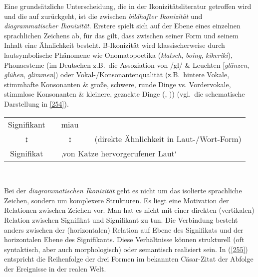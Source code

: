 Eine grundsätzliche Unterscheidung, die in der Ikonizitätsliteratur getroffen wird und die auf \citet[2.277]{Peirce1960} zurückgeht, ist die zwischen \textit{bildhafter Ikonizität} und  \textit{diagrammatischer Ikonizität}. Erstere spielt sich auf der Ebene eines einzelnen sprachlichen Zeichens ab, für das gilt, dass zwischen seiner Form und seinem Inhalt eine Ähnlichkeit besteht. B-Ikonizität wird klassischerweise durch lautsymbolische Phänomene  wie Onomatopoetika  (\textit{klatsch}, \textit{boing}, \textit{kikeriki}), Pho\-naesteme  (im Deutschen z.B.\ die Assoziation von /gl/ \& Leuchten [\textit{glänzen}, \textit{glühen}, \textit{glimmen}]) oder Vokal-/Konsonantenqualität (z.B.\ hintere Vokale, stimmhafte Konsonanten \& große, schwere, runde Dinge vs. Vordervokale, stimmlose Konsonanten \& kleinere, gezackte Dinge (\citealt{Koehler1929}, \citealt{Ramachandran2001})) (vgl.\ die schematische Darstellung in \ref{254}).

\begin{exe}
\ex\label{254}
\begin{tabular}[t]{ccccc}
  	Signifikant & & miau & &\\
 	↕ & & ↕ & & (direkte Ähnlichkeit in Laut-/Wort-Form)\\
 	Signifikat & & \multicolumn{3}{l}{‚von Katze hervorgerufener Laut‘}\\
\end{tabular}\\
\hbox{}\hfill\hbox{\citet[xxii]{Fischer1999}}
\end{exe}
Bei der \textit{diagrammatischen Ikonizität} geht es nicht um das isolierte sprachliche Zeichen, sondern um komplexere Strukturen. Es liegt eine Motivation der Relationen zwischen Zeichen vor. Man hat es nicht mit einer direkten (vertikalen) Relation zwischen Signifikat und Signifikant zu tun. Die Verbindung besteht anders zwischen der (horizontalen) Relation auf Ebene des Signifikats und der horizontalen Ebene des Signifikants. Diese Verhältnisse können strukturell (oft syntaktisch, aber auch morphologisch) oder semantisch realisiert sein. In (\ref{255}) entspricht die Reihenfolge der drei Formen im bekannten Cäsar-Zitat der Abfolge der Ereignisse in der realen Welt.

